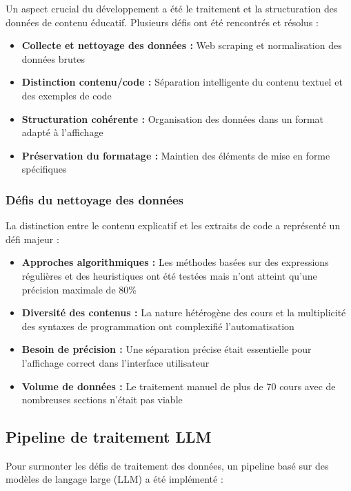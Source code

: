 Un aspect crucial du développement a été le traitement et la structuration des données de contenu éducatif. Plusieurs défis ont été rencontrés et résolus :

\begin{itemize}
  \item \textbf{Collecte et nettoyage des données :} Web scraping et normalisation des données brutes
  \item \textbf{Distinction contenu/code :} Séparation intelligente du contenu textuel et des exemples de code
  \item \textbf{Structuration cohérente :} Organisation des données dans un format adapté à l'affichage
  \item \textbf{Préservation du formatage :} Maintien des éléments de mise en forme spécifiques
\end{itemize}

\subsubsection{Défis du nettoyage des données}

La distinction entre le contenu explicatif et les extraits de code a représenté un défi majeur :

\begin{itemize}
  \item \textbf{Approches algorithmiques :} Les méthodes basées sur des expressions régulières et des heuristiques ont été testées mais n'ont atteint qu'une précision maximale de 80\%
  \item \textbf{Diversité des contenus :} La nature hétérogène des cours et la multiplicité des syntaxes de programmation ont complexifié l'automatisation
  \item \textbf{Besoin de précision :} Une séparation précise était essentielle pour l'affichage correct dans l'interface utilisateur
  \item \textbf{Volume de données :} Le traitement manuel de plus de 70 cours avec de nombreuses sections n'était pas viable
\end{itemize}

\subsection{Pipeline de traitement LLM}

Pour surmonter les défis de traitement des données, un pipeline basé sur des modèles de langage large (LLM) a été implémenté :

